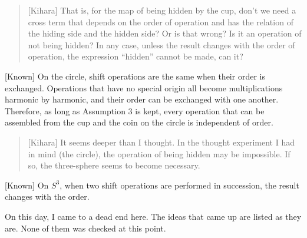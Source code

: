 \documentclass[
  a4paper,
]{article}
\begin{document}
\begin{quote}
{[}Kihara{]} That is, for the map of being hidden by the cup, don't we
need a cross term that depends on the order of operation and has the
relation of the hiding side and the hidden side? Or is that wrong? Is it
an operation of not being hidden? In any case, unless the result changes
with the order of operation, the expression ``hidden'' cannot be made,
can it?
\end{quote}

{[}Known{]} On the circle, shift operations are the same when their
order is exchanged. Operations that have no special origin all become
multiplications harmonic by harmonic, and their order can be exchanged
with one another. Therefore, as long as Assumption 3 is kept, every
operation that can be assembled from the cup and the coin on the circle
is independent of order.

\begin{quote}
{[}Kihara{]} It seems deeper than I thought. In the thought experiment I
had in mind (the circle), the operation of being hidden may be
impossible. If so, the three-sphere seems to become necessary.
\end{quote}

{[}Known{]} On \(S^3\), when two shift operations are performed in
succession, the result changes with the order.

On this day, I came to a dead end here. The ideas that came up are
listed as they are. None of them was checked at this point.
\end{document}
